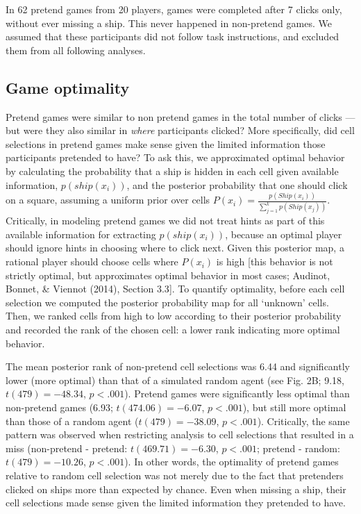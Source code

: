 \documentclass[10pt, letterpaper]{article}
\begin{document}
In 62 pretend games from 20 players, games were completed after 7 clicks
only, without ever missing a ship. This never happened in non-pretend
games. We assumed that these participants did not follow task
instructions, and excluded them from all following analyses.

\hypertarget{game-optimality}{%
\subsection{Game optimality}\label{game-optimality}}

Pretend games were similar to non pretend games in the total number of
clicks --- but were they also similar in \emph{where} participants
clicked? More specifically, did cell selections in pretend games make
sense given the limited information those participants pretended to
have? To ask this, we approximated optimal behavior by calculating the
probability that a ship is hidden in each cell given available
information, \(p(ship(x_{i}))\), and the posterior probability that one
should click on a square, assuming a uniform prior over cells
\(P(x_{i})=\frac{p(Ship(x_i))}{\sum_{j=1}^{k}p(Ship(x_j))}\).
Critically, in modeling pretend games we did not treat hints as part of
this available information for extracting \(p(ship(x_{i}))\), because an
optimal player should ignore hints in choosing where to click next.
Given this posterior map, a rational player should choose cells where
\(P(x_{i})\) is high {[}this behavior is not strictly optimal, but
approximates optimal behavior in most cases; Audinot, Bonnet, \& Viennot
(2014), Section 3.3{]}. To quantify optimality, before each cell
selection we computed the posterior probability map for all `unknown'
cells. Then, we ranked cells from high to low according to their
posterior probability and recorded the rank of the chosen cell: a lower
rank indicating more optimal behavior.

The mean posterior rank of non-pretend cell selections was 6.44 and
significantly lower (more optimal) than that of a simulated random agent
(see Fig. 2B; 9.18, \(t(479) = -48.34\), \(p < .001\)). Pretend games
were significantly less optimal than non-pretend games (6.93;
\(t(474.06) = -6.07\), \(p < .001\)), but still more optimal than those
of a random agent (\(t(479) = -38.09\), \(p < .001\)). Critically, the
same pattern was observed when restricting analysis to cell selections
that resulted in a miss (non-pretend - pretend: \(t(469.71) = -6.30\),
\(p < .001\); pretend - random: \(t(479) = -10.26\), \(p < .001\)). In
other words, the optimality of pretend games relative to random cell
selection was not merely due to the fact that pretenders clicked on
ships more than expected by chance. Even when missing a ship, their cell
selections made sense given the limited information they pretended to
have.
\end{document}

